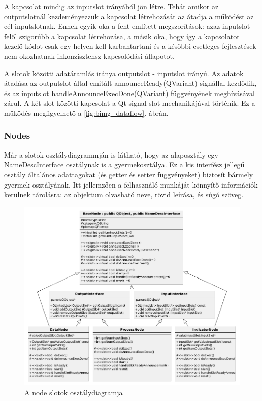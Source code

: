 \documentclass[a4paper,12pt,oneside]{report}
\begin{document}
A kapcsolat mindig az inputslot irányából jön létre. Tehát amikor az outputslotnál kezdeményezzük a kapcsolat létrehozását az átadja a működést az cél inputslotnak. Ennek egyik oka a fent említett megszorítások: azaz inputslot felől szigorúbb a kapcsolat létrehozása, a másik oka, hogy így a kapcsolatot kezelő kódot csak egy helyen kell karbantartani és a későbbi esetleges fejlesztések nem okozhatnak inkonzisztensz kapcsolódási állapotot.

A slotok közötti adatáramlás iránya outputslot - inputslot irányú. Az adatok átadása az outputslot által emitált announceReady(QVariant) signállal kezdődik, és az inputslot handleAnnounceExecDone(QVariant) függvényének meghívásával zárul. A két slot közötti kapcsolat a Qt signal-slot mechanikájával történik. Ez a működés megfigyelhető a \ref{fig:bimg_dataflow}. ábrán.

\subsubsection{Nodes}
Már a slotok osztálydiagrammján is látható, hogy az alaposztály egy NameDescInterface osztálynak is a gyermekosztálya. Ez a kis interfész jellegű osztály általános adattagokat (és getter és setter függvényeket) biztosít bármely gyermek osztályának. Itt jellemzően a felhasználó munkáját könnyítő információk kerülnek tárolásra: az objektum olvasható neve, rövid leírása, és súgó szöveg.

\begin{center}
\begin{figure}[h]
  \includegraphics[width=1.1\textwidth]{node_class_diag.png}
  \caption{A node slotok osztálydiagramja }

  \label{fig:bimg_slot_diag}
\end{figure}
\end{center}
\end{document}

